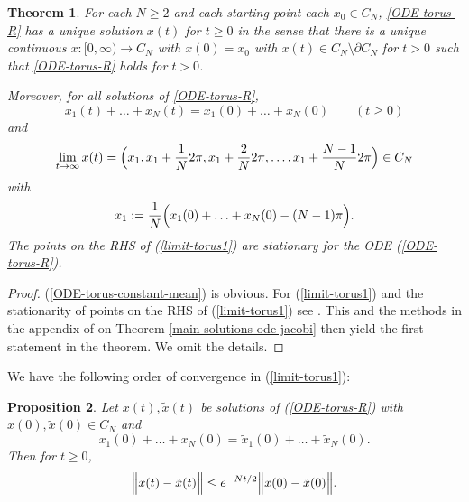 \documentclass[reqno]{amsart}
\theoremstyle{plain}
\newtheorem{theorem}{Theorem}[section]
\newtheorem{proposition}[theorem]{Proposition}
\theoremstyle{definition}
\numberwithin{equation}{section}
\begin{document}
 \begin{theorem}\label{main-solutions-ode-torus}
     For  each $N\ge2$ and each starting point
		 each $x_0\in C_N$, \eqref{ODE-torus-R} has a unique 
		 solution $x(t)$ for  $t\geq0$ in the sense that
                  there  
		 is a unique continuous  $x:[0,\infty)\to C_N$ with $x(0)=x_0$ with 
		   $x(t)\in C_N\setminus\partial C_N$ for  $t>0$ such that \eqref{ODE-torus-R} holds for  $t>0$.
                  
		   Moreover, for all solutions of \eqref{ODE-torus-R},
                   \begin{equation}\label{ODE-torus-constant-mean}
                     x_1(t)+\ldots+x_N(t)=x_1(0)+\ldots+x_N(0) \quad\quad (t\ge0)\end{equation}
 and                  
 \begin{equation}\label{limit-torus1}
   \lim_{t\to\infty}x(t)=\Bigl(x_1,x_1+\frac{1}{N}2\pi,x_1+\frac{2}{N}2\pi,\ldots, x_1+\frac{N-1}{N}2\pi\Bigr)\in C_N \end{equation}
 with
 $$x_1:= \frac{1}{N}\Bigl( x_1(0)+\ldots+x_N(0) -(N-1)\pi\Bigr).$$
The points on the RHS of (\ref{limit-torus1}) are stationary for the ODE (\ref{ODE-torus-R}).
  \end{theorem}

 \begin{proof} (\ref{ODE-torus-constant-mean}) is obvious. For   (\ref{limit-torus1}) and the stationarity of points on the RHS
 of   (\ref{limit-torus1})  see \cite{RV2}. This and the methods in the appendix 
   of  \cite{AVW} on Theorem \ref{main-solutions-ode-jacobi} then yield the first statement in the theorem. We  omit the details.
\end{proof}   

 We have the following  order of convergence in (\ref{limit-torus1}):


 \begin{proposition}\label{decreasing-error-torus}
   Let  $x(t),\tilde x(t)$ be solutions of (\ref{ODE-torus-R}) with $x(0),\tilde x(0)\in C_N$ and
   $$x_1(0)+\ldots+x_N(0)=\tilde x_1(0)+\ldots+\tilde x_N(0).$$
Then for $t\ge0$,
  $$\Bigl\|x(t)-\tilde x(t)\Bigr\|\le  e^{- N t/2}\Bigl\|x(0)-\tilde x(0)\Bigr\|.$$ 
 \end{proposition}
\end{document}
